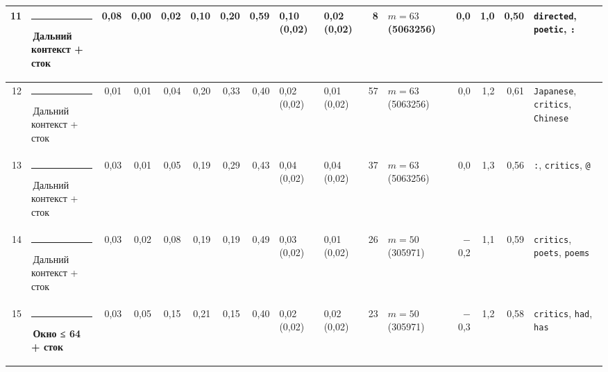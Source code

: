\documentclass[10pt]{article}
\begin{document}
\begin{minipage}{\linewidth}
\begin{center}
{\begin{tabular}{|r|l|r|r|r|r|r|r|l|l|r|l|r|r|r|l|}
11 & \textcolor[HTML]{C3C2B7}{\rule{0.62em}{0.62em}}\,Дальний контекст + сток & 0,08 & 0,00 & 0,02 & 0,10 & 0,20 & 0,59 & 0,10 (0,02) & 0,02 (0,02) & 8 & $m{=}63$ (5063256) & 0,0 & 1,0 & 0,50 & \texttt{\textvisiblespace{}directed}, \texttt{\textvisiblespace{}poetic}, \texttt{\textvisiblespace{}:} \\ \hline
12 & \textcolor[HTML]{C3C2B7}{\rule{0.62em}{0.62em}}\,Дальний контекст + сток & 0,01 & 0,01 & 0,04 & 0,20 & 0,33 & 0,40 & 0,02 (0,02) & 0,01 (0,02) & 57 & $m{=}63$ (5063256) & 0,0 & 1,2 & 0,61 & \texttt{\textvisiblespace{}Japanese}, \texttt{\textvisiblespace{}critics}, \texttt{\textvisiblespace{}Chinese} \\ \hline
13 & \textcolor[HTML]{C3C2B7}{\rule{0.62em}{0.62em}}\,Дальний контекст + сток & 0,03 & 0,01 & 0,05 & 0,19 & 0,29 & 0,43 & 0,04 (0,02) & 0,04 (0,02) & 37 & $m{=}63$ (5063256) & 0,0 & 1,3 & 0,56 & \texttt{\textvisiblespace{}:}, \texttt{\textvisiblespace{}critics}, \texttt{\textvisiblespace{}@} \\ \hline
14 & \textcolor[HTML]{C3C2B7}{\rule{0.62em}{0.62em}}\,Дальний контекст + сток & 0,03 & 0,02 & 0,08 & 0,19 & 0,19 & 0,49 & 0,03 (0,02) & 0,01 (0,02) & 26 & $m{=}50$ (305971) & $-$0,2 & 1,1 & 0,59 & \texttt{\textvisiblespace{}critics}, \texttt{\textvisiblespace{}poets}, \texttt{\textvisiblespace{}poems} \\ \hline
15 & \textcolor[HTML]{EDA100}{\rule{0.62em}{0.62em}}\,\textbf{Окно ≤ 64 + сток} & 0,03 & 0,05 & 0,15 & 0,21 & 0,15 & 0,40 & 0,02 (0,02) & 0,02 (0,02) & 23 & $m{=}50$ (305971) & $-$0,3 & 1,2 & 0,58 & \texttt{\textvisiblespace{}critics}, \texttt{\textvisiblespace{}had}, \texttt{\textvisiblespace{}has} \\ \hline
\hline\end{tabular}}\end{center}
\end{minipage}
\par\vspace{0.4em}
\end{document}
